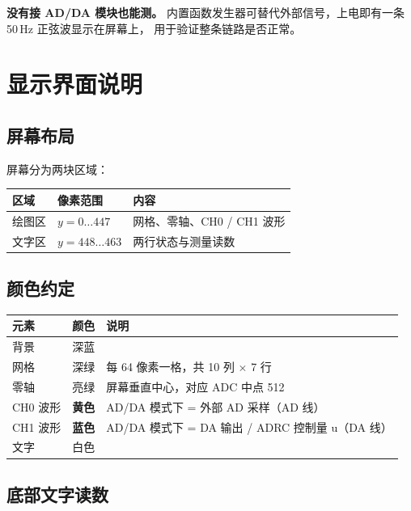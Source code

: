 \documentclass[UTF8,a4paper,11pt]{ctexart}
\begin{document}
\begin{tipbox}
\textbf{没有接 AD/DA 模块也能测。}
内置函数发生器可替代外部信号，上电即有一条 50\,Hz 正弦波显示在屏幕上，
用于验证整条链路是否正常。
\end{tipbox}

\section{显示界面说明}

\subsection{屏幕布局}

屏幕分为两块区域：

\begin{center}
\small
\begin{tabular}{lll}
\toprule
区域 & 像素范围 & 内容\\
\midrule
绘图区 & $y=0\ldots447$ & 网格、零轴、CH0 / CH1 波形\\
文字区 & $y=448\ldots463$ & 两行状态与测量读数\\
\bottomrule
\end{tabular}
\end{center}

\subsection{颜色约定}

\begin{center}
\small
\begin{tabular}{lll}
\toprule
元素 & 颜色 & 说明\\
\midrule
背景 & 深蓝 & \\
网格 & 深绿 & 每 64 像素一格，共 10 列 $\times$ 7 行\\
零轴 & 亮绿 & 屏幕垂直中心，对应 ADC 中点 512\\
CH0 波形 & \textbf{黄色} & AD/DA 模式下 = 外部 AD 采样（AD 线）\\
CH1 波形 & \textbf{蓝色} & AD/DA 模式下 = DA 输出 / ADRC 控制量 u（DA 线）\\
文字 & 白色 & \\
\bottomrule
\end{tabular}
\end{center}

\subsection{底部文字读数}
\end{document}
